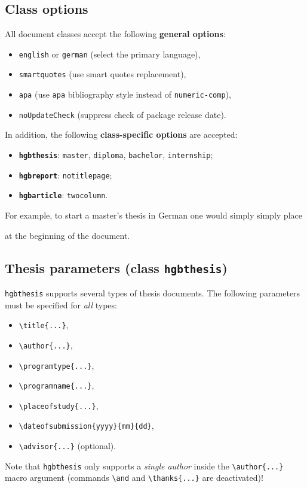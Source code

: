 \documentclass[english]{hgbarticle}
\begin{document}
\subsection{Class options} 
All document classes accept the following \textbf{general options}:
%
\begin{itemize}
\item \texttt{english} or \texttt{german} (select the primary language), 
\item \texttt{smartquotes} (use smart quotes replacement), 
\item \texttt{apa} (use \texttt{apa} bibliography style instead of \texttt{numeric-comp}),
\item \texttt{noUpdateCheck} (suppress check of package release date).
\end{itemize}
%
In addition, the following \textbf{class-specific options} are accepted:
%
\begin{itemize}
\item \textbf{\texttt{hgbthesis}}: 
	\texttt{master}, \texttt{diploma}, \texttt{bachelor}, \texttt{internship};
\item \textbf{\texttt{hgbreport}}: \texttt{notitlepage};
\item \textbf{\texttt{hgbarticle}}: \texttt{twocolumn}.
\end{itemize}
%
For example, to start a master's thesis in German
one would simply simply place
%
%
at the beginning of the document.



\subsection{Thesis parameters (class \texttt{hgbthesis})}

\texttt{hgbthesis} supports several types of thesis documents.
The following parameters must be specified for \emph{all} types:
%
\begin{itemize}
\item \verb!\title{...}!,
\item \verb!\author{...}!,
\item \verb!!,
\item \verb!!,
\item \verb!!,
\item \verb!!,
\item \verb!! (optional).
\end{itemize}
Note that \texttt{hgbthesis} only supports a \emph{single author} inside the \verb!\author{...}! macro 
argument (commands \verb!\and! and \verb!\thanks{...}! are deactivated)!
\end{document}
